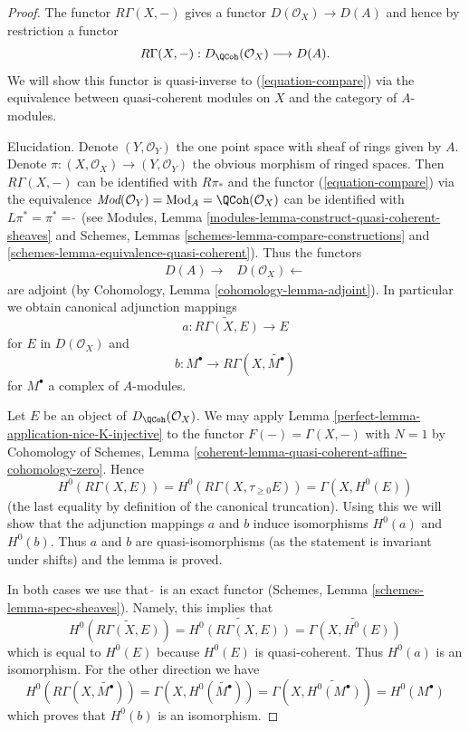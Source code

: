 \begin{proof}

The functor $R\Gamma(X, -)$ gives a functor
$D(\mathcal{O}_X) \to D(A)$ and hence by restriction a functor
\begin{equation}
\label{equation-back}
R\Gamma(X, -) : D_\QCoh(\mathcal{O}_X) \longrightarrow D(A).
\end{equation}
We will show this functor is quasi-inverse to (\ref{equation-compare})
via the equivalence between quasi-coherent modules on $X$ and
the category of $A$-modules.

\medskip\noindent
Elucidation. Denote $(Y, \mathcal{O}_Y)$ the one point space with sheaf
of rings given by $A$. Denote
$\pi : (X, \mathcal{O}_X) \to (Y, \mathcal{O}_Y)$
the obvious morphism of ringed spaces.
Then $R\Gamma(X, -)$ can be identified with $R\pi_*$ and the functor
(\ref{equation-compare}) via the equivalence
$\textit{Mod}(\mathcal{O}_Y) = \text{Mod}_A = \QCoh(\mathcal{O}_X)$
can be identified with $L\pi^* = \pi^* = \widetilde{\ }$ (see
Modules, Lemma \ref{modules-lemma-construct-quasi-coherent-sheaves} and
Schemes, Lemmas \ref{schemes-lemma-compare-constructions} and
\ref{schemes-lemma-equivalence-quasi-coherent}). Thus the functors
$$
\begin{array}{cc}D(A) \longrightarrow & D(\mathcal{O}_X) \longleftarrow\end{array}
$$
are adjoint (by Cohomology, Lemma \ref{cohomology-lemma-adjoint}). In
particular we obtain canonical adjunction mappings
$$
a : \widetilde{R\Gamma(X, E)} \longrightarrow E
$$
for $E$ in $D(\mathcal{O}_X)$ and
$$
b : M^\bullet \longrightarrow R\Gamma(X, \widetilde{M^\bullet})
$$
for $M^\bullet$ a complex of $A$-modules.

\medskip\noindent
Let $E$ be an object of $D_\QCoh(\mathcal{O}_X)$. We may apply
Lemma \ref{perfect-lemma-application-nice-K-injective}
to the functor $F(-) = \Gamma(X, -)$
with $N = 1$ by Cohomology of Schemes, Lemma
\ref{coherent-lemma-quasi-coherent-affine-cohomology-zero}.
Hence
$$
H^0(R\Gamma(X, E)) = H^0(R\Gamma(X, \tau_{\geq 0}E)) = \Gamma(X, H^0(E))
$$
(the last equality by definition of the canonical truncation).
Using this we will show that the adjunction mappings $a$ and $b$
induce isomorphisms $H^0(a)$ and $H^0(b)$. Thus $a$ and $b$
are quasi-isomorphisms (as the statement is invariant under shifts)
and the lemma is proved.

\medskip\noindent
In both cases we use that $\widetilde{\ }$ is an exact functor
(Schemes, Lemma \ref{schemes-lemma-spec-sheaves}). Namely, this
implies that
$$
H^0\left(\widetilde{R\Gamma(X, E)}\right) =
\widetilde{H^0(R\Gamma(X, E))} =
\widetilde{\Gamma(X, H^0(E))}
$$
which is equal to $H^0(E)$ because $H^0(E)$ is quasi-coherent. Thus
$H^0(a)$ is an isomorphism. For the other direction we have
$$
H^0(R\Gamma(X, \widetilde{M^\bullet})) =
\Gamma(X, H^0(\widetilde{M^\bullet})) =
\Gamma(X, \widetilde{H^0(M^\bullet)}) =
H^0(M^\bullet)
$$
which proves that $H^0(b)$ is an isomorphism.
\end{proof}


